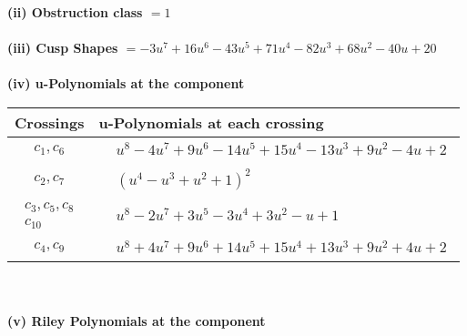 \documentclass[1p]{elsarticle_modified}
\theoremstyle{definition}
\begin{document}
\flushleft \textbf{(ii) Obstruction class $= 1$}\\~\\
\flushleft \textbf{(iii) Cusp Shapes $= -3 u^7+16 u^6-43 u^5+71 u^4-82 u^3+68 u^2-40 u+20$}\\~\\
\newpage\renewcommand{\arraystretch}{1}
\flushleft \textbf{(iv) u-Polynomials at the component}\newline \\
\begin{tabular}{m{50pt}|m{274pt}}
Crossings & \hspace{64pt}u-Polynomials at each crossing \\
\hline $$\begin{aligned}c_{1},c_{6}\end{aligned}$$&$\begin{aligned}
&u^8-4 u^7+9 u^6-14 u^5+15 u^4-13 u^3+9 u^2-4 u+2
\end{aligned}$\\
\hline $$\begin{aligned}c_{2},c_{7}\end{aligned}$$&$\begin{aligned}
&(u^4- u^3+u^2+1)^2
\end{aligned}$\\
\hline $$\begin{aligned}c_{3},c_{5},c_{8}\\c_{10}\end{aligned}$$&$\begin{aligned}
&u^8-2 u^7+3 u^5-3 u^4+3 u^2- u+1
\end{aligned}$\\
\hline $$\begin{aligned}c_{4},c_{9}\end{aligned}$$&$\begin{aligned}
&u^8+4 u^7+9 u^6+14 u^5+15 u^4+13 u^3+9 u^2+4 u+2
\end{aligned}$\\
\hline
\end{tabular}\\~\\
\newpage\renewcommand{\arraystretch}{1}
\flushleft \textbf{(v) Riley Polynomials at the component}\newline \\
\end{document}
